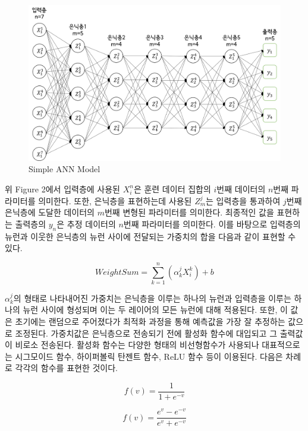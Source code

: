 \documentclass{article}
\begin{document}
\begin{figure}[h]
\centering
\includegraphics[scale=0.3]{./fig/Figure_2.png}
\caption{Simple ANN Model}
\end{figure}

위 Figure 2에서 입력층에 사용된 $X_i^n$은 훈련 데이터 집합의 $i$번째 데이터의 $n$번째 파라미터를 의미한다. 또한, 은닉층을 표현하는데 사용된 $Z_m^j$는 입력층을 통과하여 $j$번째 은닉층에 도달한 데이터의 $m$번째 변형된 파라미터를 의미한다. 최종적인 값을 표현하는 출력층의 $y_n$은 추정 데이터의 $n$번째 파라미터를 의미한다. 이를 바탕으로 입력층의 뉴런과 이웃한 은닉층의 뉴런 사이에 전달되는 가중치의 합을 다음과 같이 표현할 수 있다.

\begin{equation}
Weight Sum = \sum_{k=1}^{n}(\alpha_k^j X_i^k)+b
\end{equation}

$\alpha_k^j$의 형태로 나타내어진 가중치는 은닉층을 이루는 하나의 뉴런과 입력층을 이루는 하나의 뉴런 사이에 형성되며 이는 두 레이어의 모든 뉴런에 대해 적용된다. 또한, 이 값은 초기에는 랜덤으로 주어졌다가 최적화 과정을 통해 예측값을 가장 잘 추정하는 값으로 조정된다. 가중치값은 은닉층으로 전송되기 전에 활성화 함수에 대입되고 그 출력값이 비로소 전송된다. 활성화 함수는 다양한 형태의 비선형함수가 사용되나 대표적으로는 시그모이드 함수, 하이퍼볼릭 탄젠트 함수, ReLU 함수 등이 이용된다. 다음은 차례로 각각의 함수를 표현한 것이다.

\begin{equation}
f(v)=\frac{1}{1+e^{-v}}
\end{equation}

\begin{equation}
f(v)=\frac{e^v-e^{-v}}{e^v+e^{-v}}
\end{equation}
\end{document}
